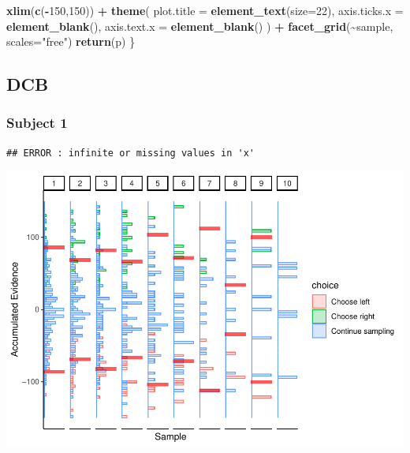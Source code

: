 \documentclass[
]{book}
\newenvironment{Shaded}{\begin{snugshade}}{\end{snugshade}}
\newcommand{\AttributeTok}[1]{\textcolor[rgb]{0.13,0.29,0.53}{#1}}
\newcommand{\DecValTok}[1]{\textcolor[rgb]{0.00,0.00,0.81}{#1}}
\newcommand{\FunctionTok}[1]{\textcolor[rgb]{0.13,0.29,0.53}{\textbf{#1}}}
\newcommand{\NormalTok}[1]{#1}
\newcommand{\SpecialCharTok}[1]{\textcolor[rgb]{0.81,0.36,0.00}{\textbf{#1}}}
\newcommand{\StringTok}[1]{\textcolor[rgb]{0.31,0.60,0.02}{#1}}
\begin{document}
\begin{Shaded}
\begin{Highlighting}[]
    \FunctionTok{xlim}\NormalTok{(}\FunctionTok{c}\NormalTok{(}\SpecialCharTok{{-}}\DecValTok{150}\NormalTok{,}\DecValTok{150}\NormalTok{)) }\SpecialCharTok{+}
    \FunctionTok{theme}\NormalTok{(}
      \AttributeTok{plot.title =} \FunctionTok{element\_text}\NormalTok{(}\AttributeTok{size=}\DecValTok{22}\NormalTok{),}
      \AttributeTok{axis.ticks.x =} \FunctionTok{element\_blank}\NormalTok{(),}
      \AttributeTok{axis.text.x =} \FunctionTok{element\_blank}\NormalTok{()}
\NormalTok{    ) }\SpecialCharTok{+}
    \FunctionTok{facet\_grid}\NormalTok{(}\SpecialCharTok{\textasciitilde{}}\NormalTok{sample, }\AttributeTok{scales=}\StringTok{"free"}\NormalTok{)}
  \FunctionTok{return}\NormalTok{(p)}
\NormalTok{\}}
\end{Highlighting}
\end{Shaded}

\hypertarget{dcb-2}{%
\subsection{DCB}\label{dcb-2}}

\hypertarget{subject-1}{%
\subsubsection*{Subject 1}\label{subject-1}}

\begin{verbatim}
## ERROR : infinite or missing values in 'x'
\end{verbatim}

\includegraphics{LateNightBayes_files/figure-latex/unnamed-chunk-18-1.pdf}
\end{document}
